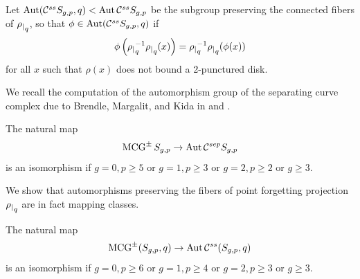\begin{definition}
  Let $\operatorname{Aut}( \mathcal C^{{ss}}  S_{g,p},q) < \operatorname{Aut}  \mathcal C^{{ss}}  S_{g,p}$
  be the subgroup preserving the connected fibers of ${\rho_|}_q$, so that $\phi \in \operatorname{Aut} ( \mathcal C^{{ss}}  S_{g,p},q)$
  if
  $$
 \phi \left(   {\rho_|}_q^{-1}{\rho_|}_q (x) \right ) =   {\rho_|}_q^{-1}{\rho_|}_q ( \phi(x))
  $$
  for all $x$ such that $\rho(x)$ does not bound a 2-punctured disk.
\end{definition}

We recall the computation of the automorphism group of the separating curve complex due to Brendle, Margalit, and Kida in \cite{kida} and \cite{commensurations}.

\begin{theorem}
  \label{thm:sepcurvecomplex}
  The natural map
  $$ \operatorname{MCG}^\pm S_{g,p} \to \operatorname{Aut}  \mathcal C^{{sep}}  S_{g,p}$$
  is an isomorphism if $g=0,p\geq5$ or $g=1,p\geq3$ or $g=2,p\geq2$ or $g\geq 3$.
\end{theorem}

We show that automorphisms preserving the fibers of point forgetting projection ${\rho_|}_q$
are in fact mapping classes.

\begin{lemma}
  The natural map
  $$ \operatorname{MCG}^\pm(S_{g,p},q) \to \operatorname{Aut}  \mathcal C^{{ss}}  (S_{g,p},q)$$
  is an isomorphism if $g=0,p\geq6$ or $g=1,p\geq4$ or $g=2,p\geq3$ or $g\geq 3$.
  \label{lemma:cssfiberpres}
\end{lemma}

